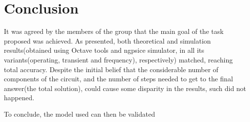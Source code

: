 \pagebreak
\section{Conclusion}
\label{con}

\par It was agreed by the members of the group that the main goal of the task proposed was achieved. As presented, both theoretical and simulation results(obtained using Octave tools and ngpsice simulator, in all its variants(operating, transient and frequency), respectively) matched, reaching total accuracy. Despite the initial belief that the considerable number of components of the circuit, and the number of steps needed to get to the final answer(the total solution),  could cause some disparity in the results, such did not happened.
\par To conclude, the model used can then be validated
